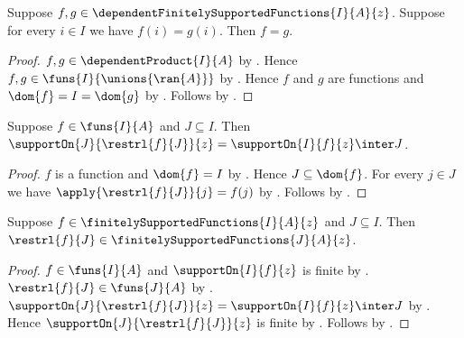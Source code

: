 \begin{proposition}\label{dependent_finitely_supported_function_extensionality}
    Suppose
        $f,g\in\dependentFinitelySupportedFunctions{I}{A}{z}$.
    Suppose for every $i\in I$ we have $f(i)=g(i)$.
    Then $f=g$.
\end{proposition}
\begin{proof}
    $f,g\in\dependentProduct{I}{A}$ by
        .
    Hence $f,g\in\funs{I}{\unions{\ran{A}}}$ by
        .
    Hence $f$ and $g$ are functions and $\dom{f}=I=\dom{g}$ by
        .
    Follows by .
\end{proof}

\begin{theorem}\label{support_of_restriction}
    Suppose $f\in\funs{I}{A}$ and $J\subseteq I$.
    Then
        $\supportOn{J}{\restrl{f}{J}}{z}
        =\supportOn{I}{f}{z}\inter J$.
\end{theorem}
\begin{proof}
    $f$ is a function and $\dom{f}=I$ by
        .
    Hence $J\subseteq\dom{f}$.
    For every $j\in J$ we have
        $\apply{\restrl{f}{J}}{j}=f(j)$ by
        .
    Follows by
        .
\end{proof}

\begin{theorem}\label{finite_support_restriction}
    Suppose $f\in\finitelySupportedFunctions{I}{A}{z}$ and
        $J\subseteq I$.
    Then
        $\restrl{f}{J}\in\finitelySupportedFunctions{J}{A}{z}$.
\end{theorem}
\begin{proof}
    $f\in\funs{I}{A}$ and $\supportOn{I}{f}{z}$ is finite by
        .
    $\restrl{f}{J}\in\funs{J}{A}$ by .
    $\supportOn{J}{\restrl{f}{J}}{z}
        =\supportOn{I}{f}{z}\inter J$ by
        .
    Hence $\supportOn{J}{\restrl{f}{J}}{z}$ is finite by
        .
    Follows by .
\end{proof}

